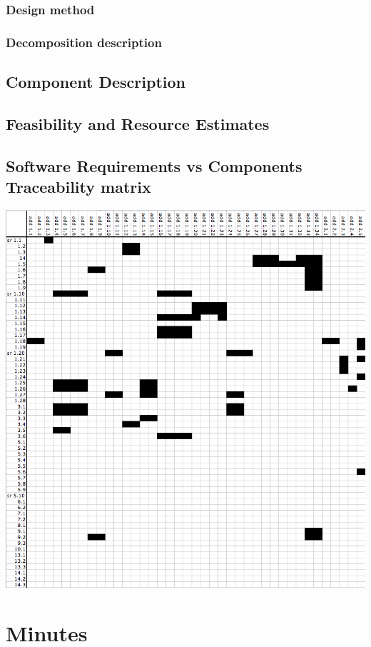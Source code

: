   \subsection{Design method}
    \label{sub:design_method}
    
  \subsection{Decomposition description}
    \label{sub:decomposition_description}
    
\section{Component Description}
  \label{sec:component_description}
  
\section{Feasibility and Resource Estimates}
  \label{sec:feasibility_and_resource_estimate}
  
\section{Software Requirements vs Components Traceability matrix} %
  \label{sec:traceability_matrix}
  \includegraphics[scale=0.55]{graphics/traceability_matrix.png}

\appendix

\chapter{Minutes}
  

